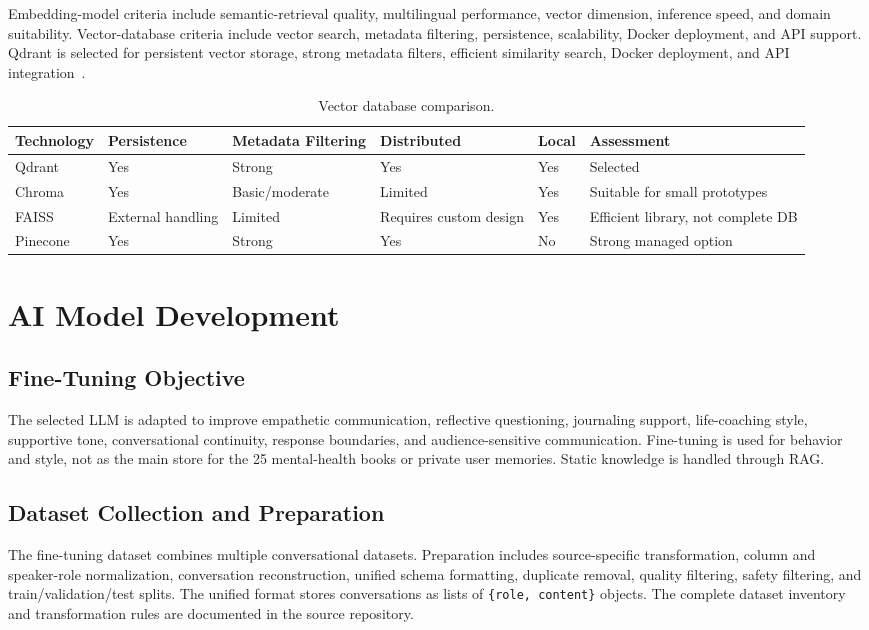 \documentclass[12pt,a4paper,oneside,openany]{report}
\begin{document}
Embedding-model criteria include semantic-retrieval quality, multilingual performance, vector dimension, inference speed, and domain suitability. Vector-database criteria include vector search, metadata filtering, persistence, scalability, Docker deployment, and API support. Qdrant is selected for persistent vector storage, strong metadata filters, efficient similarity search, Docker deployment, and API integration~\cite{qdrant2024}.

\begin{table}[H]
\centering\small
\caption{Vector database comparison.}
\label{tab:vecdb}
\begin{tabular}{@{}llllll@{}}
\toprule
Technology & Persistence & Metadata Filtering & Distributed & Local & Assessment \\
\midrule
Qdrant & Yes & Strong & Yes & Yes & Selected \\
Chroma & Yes & Basic/moderate & Limited & Yes & Suitable for small prototypes \\
FAISS & External handling & Limited & Requires custom design & Yes & Efficient library, not complete DB \\
Pinecone & Yes & Strong & Yes & No & Strong managed option \\
\bottomrule
\end{tabular}
\end{table}

\section{AI Model Development}

\subsection{Fine-Tuning Objective}

The selected LLM is adapted to improve empathetic communication, reflective questioning, journaling support, life-coaching style, supportive tone, conversational continuity, response boundaries, and audience-sensitive communication. Fine-tuning is used for behavior and style, not as the main store for the 25 mental-health books or private user memories. Static knowledge is handled through RAG.

\subsection{Dataset Collection and Preparation}

The fine-tuning dataset combines multiple conversational datasets. Preparation includes source-specific transformation, column and speaker-role normalization, conversation reconstruction, unified schema formatting, duplicate removal, quality filtering, safety filtering, and train/validation/test splits. The unified format stores conversations as lists of \texttt{\{role, content\}} objects. The complete dataset inventory and transformation rules are documented in the source repository.
\end{document}
